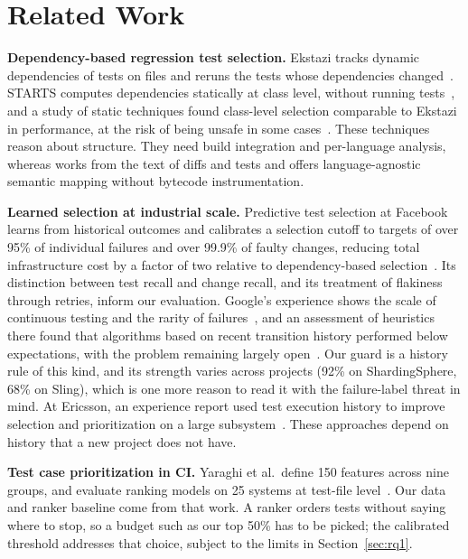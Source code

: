 \section{Related Work}
\label{sec:related}

\textbf{Dependency-based regression test selection.} Ekstazi tracks dynamic dependencies of tests on files and reruns the tests whose dependencies changed~\cite{gligoric2015ekstazi}. STARTS computes dependencies statically at class level, without running tests~\cite{legunsen2017starts}, and a study of static techniques found class-level selection comparable to Ekstazi in performance, at the risk of being unsafe in some cases~\cite{legunsen2016static}. These techniques reason about structure. They need build integration and per-language analysis, whereas \tool{} works from the text of diffs and tests and offers language-agnostic semantic mapping without bytecode instrumentation.

\textbf{Learned selection at industrial scale.} Predictive test selection at Facebook learns from historical outcomes and calibrates a selection cutoff to targets of over 95\% of individual failures and over 99.9\% of faulty changes, reducing total infrastructure cost by a factor of two relative to dependency-based selection~\cite{machalica2019predictive}. Its distinction between test recall and change recall, and its treatment of flakiness through retries, inform our evaluation. Google's experience shows the scale of continuous testing and the rarity of failures~\cite{memon2017taming}, and an assessment of heuristics there found that algorithms based on recent transition history performed below expectations, with the problem remaining largely open~\cite{leong2019transition}. Our guard is a history rule of this kind, and its strength varies across projects (92\% on ShardingSphere, 68\% on Sling), which is one more reason to read it with the failure-label threat in mind. At Ericsson, an experience report used test execution history to improve selection and prioritization on a large subsystem~\cite{najafi2019improving}. These approaches depend on history that a new project does not have.

\textbf{Test case prioritization in CI.} Yaraghi et al.\ define 150 features across nine groups, and evaluate ranking models on 25 systems at test-file level~\cite{yaraghi2023tcpci}. Our data and ranker baseline come from that work. A ranker orders tests without saying where to stop, so a budget such as our top 50\% has to be picked; the calibrated threshold addresses that choice, subject to the limits in Section~\ref{sec:rq1}.


